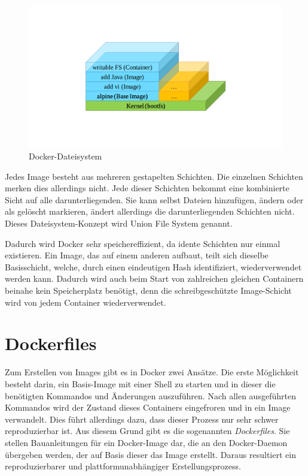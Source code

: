 \begin{figure}[htbp]
    \centering
    \includegraphics[width=0.7\linewidth,clip,trim=130 130 130 110]{images/docker-filesystem}
    \caption{Docker-Dateisystem}
\label{fig:docker-dateisystem}
\end{figure}

Jedes Image besteht aus mehreren gestapelten Schichten.
Die einzelnen Schichten merken dies allerdings nicht.
Jede dieser Schichten bekommt eine kombinierte Sicht auf alle darunterliegenden.
Sie kann selbst Dateien hinzufügen, ändern oder als gelöscht markieren, ändert allerdings die darunterliegenden Schichten nicht.
Dieses Dateisystem-Konzept wird Union File System genannt.

Dadurch wird Docker sehr speichereffizient, da idente Schichten nur einmal existieren.
Ein Image, das auf einem anderen aufbaut, teilt sich dieselbe Basisschicht, welche, durch einen eindeutigen Hash identifiziert, wiederverwendet werden kann.
Dadurch wird auch beim Start von zahlreichen gleichen Containern beinahe kein Speicherplatz benötigt, denn die schreibgeschützte Image-Schicht wird von jedem Container wiederverwendet.


\section{Dockerfiles}
\label{sec:dockerfiles}
Zum Erstellen von Images gibt es in Docker zwei Ansätze.
Die erste Möglichkeit besteht darin, ein Basis-Image mit einer Shell zu starten und in dieser die benötigten Kommandos und Änderungen auszuführen.
Nach allen ausgeführten Kommandos wird der Zustand dieses Containers eingefroren und in ein Image verwandelt.
Dies führt allerdings dazu, dass dieser Prozess nur sehr schwer reproduzierbar ist.
Aus diesem Grund gibt es die sogenannten \emph{Dockerfiles}.
Sie stellen Bauanleitungen für ein Docker-Image dar, die an den Docker-Daemon übergeben werden, der auf Basis dieser das Image erstellt.
Daraus resultiert ein reproduzierbarer und plattformunabhängiger Erstellungsprozess.

